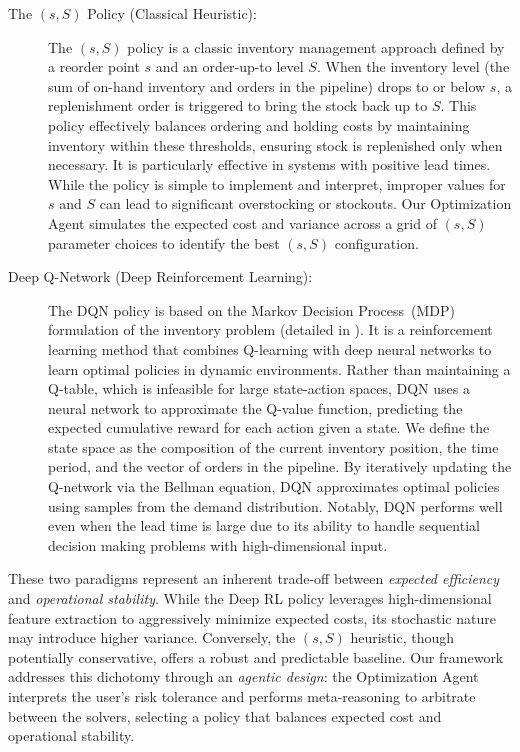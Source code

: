 \begin{description}
    \item[The $(s, S)$ Policy (Classical Heuristic):] The $(s, S)$ policy is a classic inventory management approach defined by a reorder point $s$ and an order-up-to level $S$. When the inventory level (the sum of on-hand inventory and orders in the pipeline) drops to or below $s$, a replenishment order is triggered to bring the stock back up to $S$. This policy effectively balances ordering and holding costs by maintaining inventory within these thresholds, ensuring stock is replenished only when necessary. It is particularly effective in systems with positive lead times. While the policy is simple to implement and interpret, improper values for $s$ and $S$ can lead to significant overstocking or stockouts. Our Optimization Agent simulates the expected cost and variance across a grid of $(s, S)$ parameter choices to identify the best $(s, S)$ configuration.
    \item[Deep Q-Network (Deep Reinforcement Learning):] The DQN policy is based on the Markov Decision Process~(MDP) formulation of the inventory problem (detailed in ). It is a reinforcement learning method that combines Q-learning with deep neural networks to learn optimal policies in dynamic environments. Rather than maintaining a Q-table, which is infeasible for large state-action spaces, DQN uses a neural network to approximate the Q-value function, predicting the expected cumulative reward for each action given a state. We define the state space as the composition of the current inventory position, the time period, and the vector of orders in the pipeline. By iteratively updating the Q-network via the Bellman equation, DQN approximates optimal policies using samples from the demand distribution. Notably, DQN performs well even when the lead time is large due to its ability to handle sequential decision making problems with high-dimensional input.    
    \end{description}    
    These two paradigms represent an inherent trade-off between \textit{expected efficiency} and \textit{operational stability}. While the Deep RL policy leverages high-dimensional feature extraction to aggressively minimize expected costs, its stochastic nature may introduce higher variance. Conversely, the $(s, S)$ heuristic, though potentially conservative, offers a robust and predictable baseline.   
    Our framework addresses this dichotomy through an \textit{agentic design}: the Optimization Agent interprets the user's risk tolerance and performs meta-reasoning to arbitrate between the solvers, selecting a policy that balances expected cost and operational stability.


